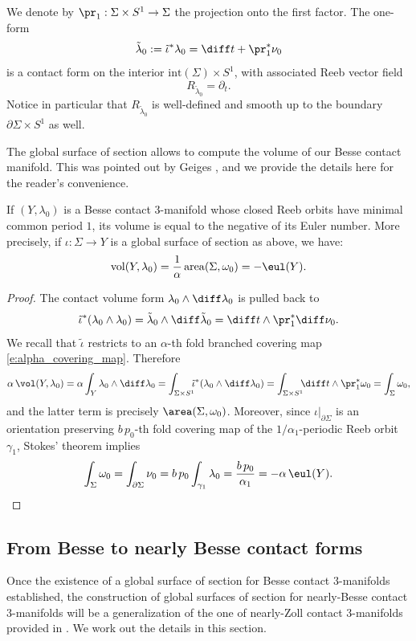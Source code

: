 We denote by $\pr_1:\Sigma\times S^1\to\Sigma$ the projection onto the first factor.
The one-form
\begin{equation}
\label{e:tilde_lambda_0}
\tilde\lambda_0
:=
\tilde\iota^*\lambda_0=\diff t+\pr_1^*\nu_0
\end{equation}
is a contact form on the interior $\mathrm{int}(\Sigma)\times S^1$, with associated Reeb vector field
\[
R_{\tilde\lambda_0}=\partial_t.
\]
Notice in particular that $R_{\tilde\lambda_0}$ is well-defined and smooth up to the boundary $\partial \Sigma\times S^1$ as well.

The global surface of section allows to compute the volume of our Besse contact manifold. This was pointed out by Geiges \cite{Geiges:2020aa}, and we provide the details here for the reader's convenience.
\begin{lem}
\label{l:volume_Besse}
If $(Y,\lambda_0)$ is a Besse contact $3$-manifold whose closed Reeb orbits have minimal common period $1$, its volume is equal to the negative of its Euler number. More precisely, if $\iota: \Sigma \to Y$ is a global surface of section as above, we have:
\[
\mathrm{vol}(Y,\lambda_0) = \frac{1}{\alpha}\, \mathrm{area}(\Sigma,\omega_0) = -\eul(Y).
\]
\end{lem}

\begin{proof}
The contact volume form $\lambda_0\wedge\diff\lambda_0$ is pulled back to
\[
\tilde\iota^*(\lambda_0\wedge\lambda_0)
=
\tilde\lambda_0\wedge\diff\tilde\lambda_0
=
\diff t\wedge\pr_1^*\diff\nu_0.
\]
We recall that $\tilde\iota$ restricts to an $\alpha$-th fold branched covering map \eqref{e:alpha_covering_map}. Therefore
\[
\alpha\,\vol(Y,\lambda_0)
=
\alpha
\int_{Y}\lambda_0\wedge\diff\lambda_0
=
\int_{\Sigma\times S^1} \!\!\!\tilde\iota^*(\lambda_0\wedge\diff\lambda_0)
=
\int_{\Sigma\times S^1} \!\!\! \diff t\wedge \pr_1^*\omega_0
=\int_\Sigma \omega_0,
\]
and the latter term is precisely $\area(\Sigma,\omega_0)$. Moreover, since $\iota|_{\partial\Sigma}$ is an orientation preserving $b\,p_0$-th fold covering map of the $1/\alpha_1$-periodic Reeb orbit $\gamma_1$, Stokes' theorem implies
\[
\int_\Sigma \omega_0
=\int_{\partial\Sigma} \nu_0
=
b\,p_0\int_{\gamma_1} \lambda_0
=
\frac{b\,p_0}{\alpha_1}
=
-\alpha\, \eul(Y)
.
\qedhere
\]
\end{proof}

\subsection{From Besse to nearly Besse contact forms}\label{s:nearly_Besse}
Once the existence of a global surface of section for Besse contact $3$-manifolds established, the construction of global surfaces of section for nearly-Besse contact $3$-manifolds will be a generalization of the one of nearly-Zoll contact $3$-manifolds provided in \cite{Abbondandolo:2018fb,Benedetti:2021aa}. We work out the details in this section.

